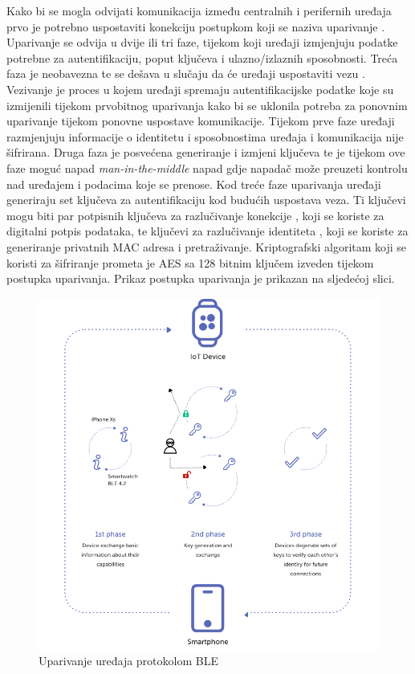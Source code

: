 \documentclass[times, utf8, diplomski]{fer}
\begin{document}
Kako bi se mogla odvijati komunikacija između centralnih i perifernih uređaja prvo je potrebno uspostaviti konekciju postupkom koji se naziva uparivanje . Uparivanje se odvija u dvije ili tri faze, tijekom koji uređaji izmjenjuju podatke potrebne za autentifikaciju, poput ključeva i ulazno/izlaznih sposobnosti. Treća faza je neobavezna te se dešava u slučaju da će uređaji uspostaviti vezu . Vezivanje  je proces u kojem uređaji spremaju autentifikacijske podatke koje su izmijenili tijekom prvobitnog uparivanja kako bi se uklonila potreba za ponovnim uparivanje tijekom ponovne uspostave komunikacije. Tijekom prve faze uređaji razmjenjuju informacije o identitetu i sposobnostima uređaja i komunikacija nije šifrirana. Druga faza je posvećena generiranje i izmjeni ključeva te je tijekom ove faze moguć napad \emph{man-in-the-middle} napad gdje napadač može preuzeti kontrolu nad uređajem i podacima koje se prenose. Kod treće faze uparivanja uređaji generiraju set ključeva za autentifikaciju kod budućih uspostava veza. Ti ključevi mogu biti par potpisnih ključeva za razlučivanje konekcije , koji se koriste za digitalni potpis podataka, te ključevi za razlučivanje identiteta , koji se koriste za generiranje privatnih MAC adresa i pretraživanje. Kriptografski algoritam koji se koristi za šifriranje prometa je AES  sa 128 bitnim ključem izveden tijekom postupka uparivanja. Prikaz postupka uparivanja je prikazan na sljedećoj slici.
\begin{figure}[H]
    \centering
    \includegraphics[width=13cm]{images/ble.png}
    \caption{Uparivanje uređaja protokolom BLE \citep{Kacherovska2019Aug}}
    \label{fig:ble}
\end{figure}
\end{document}
